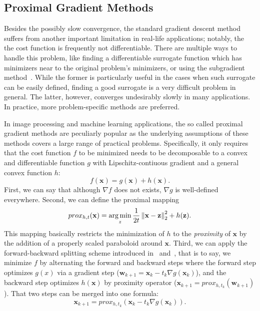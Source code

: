 \subsection{Proximal Gradient Methods}

Besides the possibly slow convergence, the standard gradient descent method suffers from another important limitation in real-life applications; notably, the the cost function is frequently not differentiable. There are multiple ways to handle this problem, like finding a differentiable surrogate function which has minimizers near to the original problem's minimizers, or using the subgradient method~\cite{shor_minimization_2012}. While the former is particularly useful in the cases when such surrogate can be easily defined, finding a good surrogate is a very difficult problem in general. The latter, however, converges undesirably slowly in many applications. In practice, more problem-specific methods are preferred.

In image processing and machine learning applications, the so called proximal gradient methods are peculiarly popular as the underlying assumptions of these methods covers a large range of practical problems. Specifically, it only requires that the cost function $f$ to be minimized needs to be decomposable to a convex and differentiable function $g$ with Lipschitz-contiuous gradient and a general convex function $h$:
\[f(\mathbf{x}) = g(\mathbf{x}) + h(\mathbf{x}).\]
First, we can say that although $\nabla f$ does not exists, $\nabla g$ is well-defined everywhere. Second, we can define the proximal mapping
\[prox_{h,t}(\mathbf{x}) = \operatorname*{arg\,min}_z \frac{1}{2t} \left\lVert\mathbf{x} - \mathbf{z}\right\rVert_2^2 + h(\mathbf{z}).\]
This mapping basically restricts the minimization of $h$ to the \textit{proximity} of $\mathbf{x}$ by the addition of a properly scaled paraboloid around $\mathbf{x}$. Third, we can apply the forward-backward splitting scheme introduced in~\cite{martinet_breve_1970} and~\cite{bruck_weak_1977}, that is to say, we minimize $f$ by alternating the forward and backward steps where the forward step optimizes $g(x)$ via a gradient step ($\mathbf{w}_{k+1} = \mathbf{x}_k - t_k \nabla g(\mathbf{x}_k)$), and the backward step optimizes $h(\mathbf{x})$ by proximity operator ($\mathbf{x}_{k+1} = prox_{h,t_k}(\mathbf{w}_{k+1})$). That two steps can be merged into one formula:
\[\mathbf{x}_{k+1} = prox_{h,t_k}(\mathbf{x}_k - t_k \nabla g(\mathbf{x}_k)).\]

